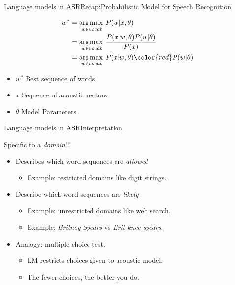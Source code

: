 \begin{frame} {Language models in ASR}{Recap:Probabilistic Model for Speech Recognition}

\begin{align*}
w^* & = \argmax_{w \in vocab} P(w | x, \theta) \\
       & = \argmax_{w \in vocab} \frac{P(x | w, \theta) P(w | \theta)} { P(x)} \\
       & = \argmax_{w \in vocab} P(x | w, \theta)  { \color{red} P(w | \theta)} \\
\end{align*}

\begin{itemize}
\item $w^*$  Best sequence of words
\item $x$ Sequence of acoustic vectors
\item $\theta$  Model Parameters
\end{itemize}
\end{frame}

\begin{frame} {Language models in ASR}{Interpretation}

Specific to a \emph{domain}!!!

\begin{itemize}
\item Describes which word sequences are \emph{allowed}

\begin{itemize}
    \item Example: restricted domains like digit strings.
\end{itemize}

\item  Describe which word sequences are \emph{likely}
\begin{itemize}
   \item Example: unrestricted domains like web search.
   \item Example: {\it Britney Spears} vs {\it Brit knee spears}.
\end{itemize}

\item Analogy: multiple-choice test.
\begin{itemize}
    \item LM restricts choices given to acoustic model.
    \item The fewer choices, the better you do.
\end{itemize}

\end{itemize}

\end{frame}
    

